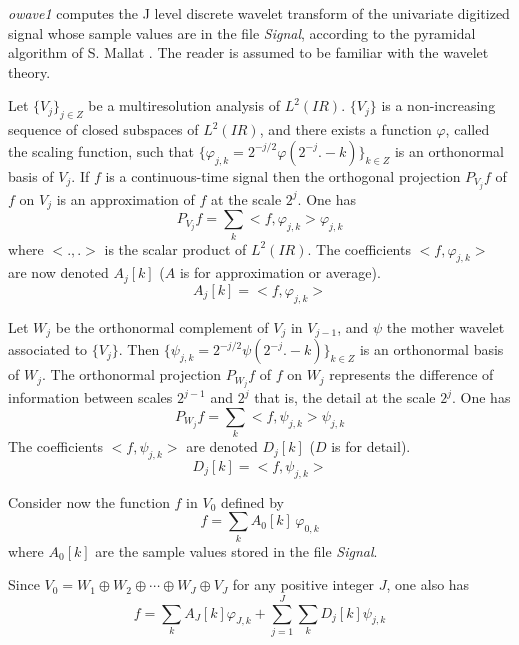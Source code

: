 \parindent 0.6cm 
\parskip 0.4cm

\def\real{I\!\!R}


{\em owave1} computes the J level discrete wavelet transform of the univariate digitized signal whose sample values are in the file {\em Signal}, according to the pyramidal algorithm of S. Mallat \cite{kn:ma1}. The reader is assumed to be familiar with the wavelet theory. 

Let \( \{V_{j}\}_{j \in Z} \) be a multiresolution analysis of \( L^{2}(\real) \). \( \{V_{j}\} \) is a non-increasing sequence of closed subspaces of \( L^{2}(\real) \), and there exists a function \( \varphi \), called the scaling function, such that \( \{\varphi_{j,k} = 2^{-j/2}\varphi(2^{-j}.-k)\}_{k \in Z} \) is an orthonormal basis of \( V_{j} \). If \( f \) is a continuous-time signal then the orthogonal projection \( P_{V_{j}}f \) of \( f \) on \( V_{j} \) is an approximation of \( f \) at the scale \( 2^{j} \). One has
\[
P_{V_{j}}f = \sum_{k} <f,\varphi_{j, k}> \varphi_{j, k}
\]
where \( <.,.> \) is the scalar product of \( L^{2}(\real) \).
The coefficients \( <f,\varphi_{j, k}> \) are now denoted \( A_{j}[k] \) ($A$ is for approximation or average). 
\[
A_{j}[k] = < f,\varphi_{j,k} > 
\]

Let \( W_{j} \) be the orthonormal complement of \( V_{j} \) in \( V_{j-1} \), and \( \psi \) the mother wavelet associated to \( \{V_{j}\} \). Then \( \{\psi_{j,k} = 2^{-j/2}\psi(2^{-j}.-k)\}_{k \in Z} \) is an orthonormal basis of \( W_{j} \). The orthonormal projection \( P_{W_{j}}f \) of \( f \) on \( W_{j} \) represents the difference of information between scales \( 2^{j-1} \) and \( 2^{j} \) that is, the detail at the scale \( 2^{j} \). One has
\[
P_{W_{j}}f = \sum_{k} <f,\psi_{j, k}> \psi_{j, k}
\]
The coefficients \( <f,\psi_{j, k}> \) are denoted \( D_{j}[k] \) ($D$ is for detail).
\[
D_{j}[k] = < f,\psi_{j,k} >
\]

Consider now the function \( f \) in \( V_{0} \) defined by
\[
f = \sum_{k} A_{0}[k] \, \varphi_{0,k}
\]
where $A_{0}[k]$ are the sample values stored in the file {\em Signal}.

Since \( V_{0} = W_{1} \oplus W_{2} \oplus \cdots \oplus W_{J} \oplus V_{J} \) for any positive integer $J$, one also has
\[
f = \sum_{k} A_{J}[k] \varphi_{J,k} + \sum_{j = 1}^{J} \sum_{k} D_{j}[k] \psi_{j,k}
\]

